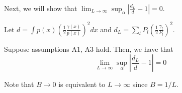 \documentclass{article}
\begin{document}
Next, we will show that $\lim_{L \rightarrow \infty} \sup_\alpha \left| \frac{d_L}{d} - 1 \right| = 0$. 

\begin{proposition}
\label{prop:convergence_discrete_continuous_renyi}

Let $d = \int p(x) \left( \frac{1}{2} \frac{\gamma(x)}{p(x)} \right)^2 dx$ and $d_L = \sum_l P_l \left( \frac{1}{2} \frac{\gamma_l}{P_l} \right)^2$. 

Suppose assumptions A1, A3 hold. Then, we have that
\[
\lim_{L \rightarrow \infty} \sup_\alpha \left| \frac{d_L}{d} - 1 \right| = 0
\]

\end{proposition}


Note that $B \rightarrow 0$ is equivalent to $L \rightarrow \infty$ since $B = 1/L$. 
\end{document}

